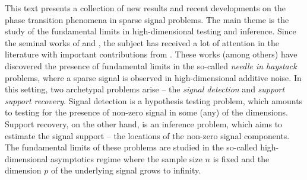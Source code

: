 
\preface



%
 


This text presents a collection of new results and recent developments on the phase transition phenomena in sparse signal problems.
The main theme is the study of the fundamental limits in high-dimensional testing and inference. Since the seminal works
of \cite{ingster1998minimax} and \cite{donoho2004higher}, the subject has received a lot of attention in the literature with important contributions
from \cite{ji2012ups,genovese2012comparison,jin2014optimality,arias2017distribution,butucea2018variable}.  These works (among others) 
 have discovered the presence of fundamental limits in the so-called  {\em needle in haystack} problems, where a sparse signal is observed in 
 high-dimensional additive noise.  In this setting, two archetypal  problems arise -- the {\em signal detection} and {\em support support recovery}.  
 Signal detection is a hypothesis testing problem, which amounts
to testing for the presence of non-zero signal in some (any) of the dimensions.  Support recovery, on the other hand, is an inference problem, which aims to estimate the signal support -- the locations of the non-zero signal components.  The fundamental limits of these problems are studied in the so-called high-dimensional asymptotics regime where the sample size $n$ is fixed and the dimension $p$ of the underlying signal 
grows to infinity.   


